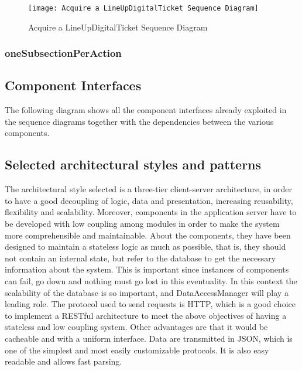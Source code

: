 \begin{figure}[H]
 \centering
 \texttt{[image: Acquire a LineUpDigitalTicket Sequence Diagram]}
 \caption{ Acquire a LineUpDigitalTicket Sequence Diagram}
 \end{figure}



\subsubsection{oneSubsectionPerAction}

\subsection{Component Interfaces}
The following diagram shows all the component interfaces already exploited in the sequence diagrams together with the dependencies between the various components. 

\subsection{Selected architectural styles and patterns}
The architectural style selected is a three-tier client-server architecture, in order to have a good decoupling of logic, data and presentation, increasing reusability, flexibility and scalability. Moreover, components in the application server have to be developed with low coupling among modules in order to make the system more comprehensible and maintainable. About the components, they have been designed to maintain a stateless logic as much as possible, that is, they should not contain an internal state, but refer to the database to get the necessary information about the system. This is important since instances of components can fail, go down and nothing must go lost in this eventuality. In this context the scalability of the database is so important, and DataAccessManager will play a leading role. 
The protocol used to send requests is HTTP, which is a good choice to implement a RESTful architecture to meet the above objectives of having a stateless and low coupling system. Other advantages are that it would be cacheable and with a uniform interface.
Data are transmitted in JSON, which is one of the simplest and most easily customizable protocols. It is also easy readable and allows fast parsing.\\

